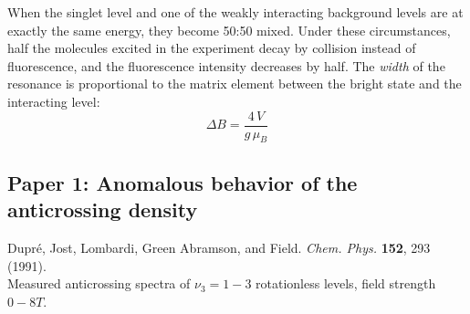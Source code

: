 \documentclass[12pt]{mitthesis}
\begin{document}
When the singlet level and one of the weakly interacting background
levels are at exactly the same energy, they become 50:50 mixed.  Under
these circumstances, half the molecules excited in the experiment
decay by collision instead of fluorescence, and the fluorescence
intensity decreases by half.  The \emph{width} of the resonance is
proportional to the matrix element between the bright state and the
interacting level:
\begin{equation}
\Delta B = \frac{4\,V}{g\,\mu_B}
\end{equation}

\subsection{Paper 1: Anomalous behavior of the anticrossing density}

Dupr\'{e}, Jost, Lombardi, Green Abramson, and Field.
\emph{Chem. Phys.}  \textbf{152}, 293 (1991).\\
Measured anticrossing spectra of $\nu_3=1-3$ rotationless levels,
field strength $0-8T$.
\end{document}
